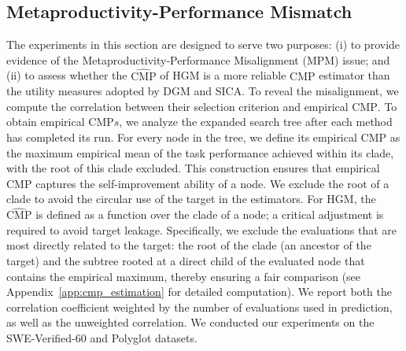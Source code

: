 \documentclass{article}
\begin{document}
\subsection{Metaproductivity-Performance Mismatch}
\label{sec:metaproductivity-performance-mismatch}
The experiments in this section are designed to serve two purposes: (i) to provide evidence of the Metaproductivity-Performance Misalignment (MPM) issue; and (ii) to assess whether the $\widehat{\mathrm{CMP}}$ of HGM is a more reliable $\mathrm{CMP}$ estimator than the utility measures adopted by DGM and SICA. 
To reveal the misalignment, we compute the correlation between their selection criterion and empirical $\mathrm{CMP}$. 
To obtain empirical $\mathrm{CMP}s$, we analyze the expanded search tree after each method has completed its run. For every node in the tree, we define its empirical $\mathrm{CMP}$ as the maximum empirical mean of the task performance achieved within its clade, with the root of this clade excluded. 
This construction ensures that empirical $\mathrm{CMP}$ captures the self-improvement ability of a node.
We exclude the root of a clade to avoid the circular use of the target in the estimators.
For HGM, the $\widehat{\mathrm{CMP}}$ is defined as a function over the clade of a node; a critical adjustment is required to avoid target leakage. 
Specifically, we exclude the evaluations that are most directly related to the target: the root of the clade (an ancestor of the target) and the subtree rooted at a direct child of the evaluated node that contains the empirical maximum, thereby ensuring a fair comparison (see Appendix~\ref{app:cmp_estimation} for detailed computation). 
We report both the correlation coefficient weighted by the number of evaluations used in prediction, as well as the unweighted correlation.
We conducted our experiments on the SWE-Verified-60 and Polyglot datasets.
\end{document}

